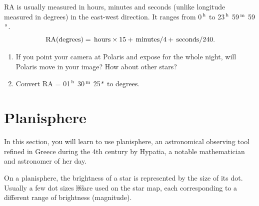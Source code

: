 \documentclass[10pt]{article}%
\begin{document}
RA is usually measured in hours, minutes and seconds (unlike longitude measured in degrees) in the east-west direction.  It ranges from 0$^{\rm \,h}$ to 23$^{\rm \,h}$ 59$^{\rm \,m}$ 59$^{\rm \,s}$.
\begin{equation}
{\rm \,RA (degrees)} = {\rm \,hours} \times 15 + {\rm \,minutes}/4 + {\rm \,seconds}/240.
\end{equation}

\begin{enumerate}

\item If you point your camera at Polaris and expose for the whole night, will Polaris move in your image? How about other stars?

\item Convert RA = 01$^{\rm \,h}$ 30$^{\rm \,m}$ 25$^{\rm \,s}$ to degrees.
\end{enumerate}


\section{Planisphere}

In this section, you will learn to use planisphere, an astronomical observing tool refined in Greece during the 4th century by Hypatia, a notable mathematician and astronomer of her day.

On a planisphere, the brightness of a star is represented by the size of its dot. Usually a few dot sizes ￼are used on the star map, each corresponding to a different range of brightness (magnitude). 
\end{document}
